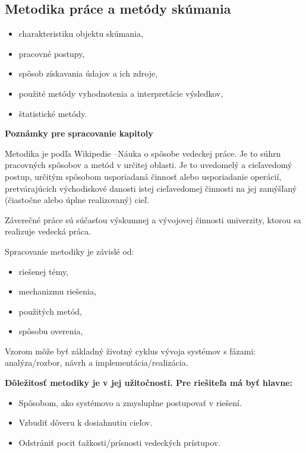 \subsection{Metodika práce a metódy skúmania}

\begin{itemize}
	\item charakteristiku objektu skúmania, 
	\item pracovné postupy, 
	\item spôsob získavania údajov a ich zdroje,
	\item použité metódy vyhodnotenia a interpretácie výsledkov,
	\item štatistické metódy.
\end{itemize}

\textbf{Poznámky pre spracovanie kapitoly}

Metodika je podľa Wikipedie –Náuka o spôsobe vedeckej práce. Je to súhrn pracovných spôsobov a metód v určitej oblasti. Je to uvedomelý a cieľavedomý postup, určitým spôsobom usporiadaná činnosť alebo usporiadanie operácií, pretvárajúcich východiskové danosti istej cieľavedomej činnosti na jej zamýšľaný (čiastočne alebo úplne realizovaný) cieľ. 

Záverečné práce sú súčasťou výskumnej a vývojovej činnosti univerzity, ktorou sa realizuje vedecká práca. 

Spracovanie metodiky je závislé od:

\begin{itemize}
	\item riešenej témy,
	\item mechanizmu riešenia,
	\item použitých metód,
	\item spôsobu overenia,
\end{itemize}

Vzorom môže byť základný životný cyklus vývoja systémov s fázami: analýza/rozbor, návrh a implementácia/realizácia.

\textbf{Dôležitosť metodiky je v jej užitočnosti. Pre riešiteľa má byť hlavne:}

\begin{itemize}
	\item Spôsobom, ako systémovo a zmysluplne postupovať v riešení.
	\item Vzbudiť dôveru k dosiahnutiu cieľov.
	\item Odstrániť pocit  ťažkosti/prísnosti vedeckých prístupov. 
\end{itemize}

